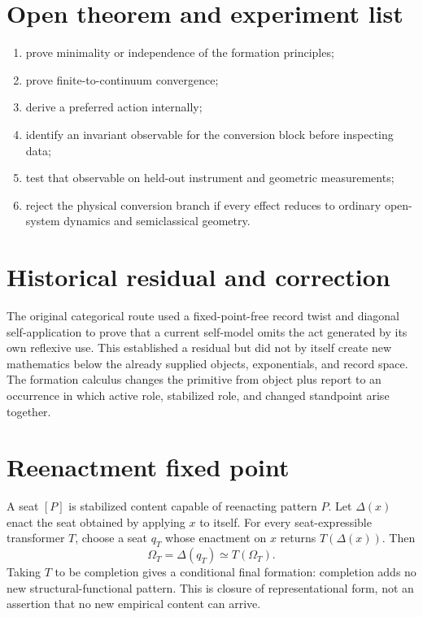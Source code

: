 \documentclass[11pt,a4paper]{article}
\begin{document}
\section{Open theorem and experiment list}
\begin{enumerate}
\item prove minimality or independence of the formation principles;
\item prove finite-to-continuum convergence;
\item derive a preferred action internally;
\item identify an invariant observable for the conversion block before inspecting data;
\item test that observable on held-out instrument and geometric measurements;
\item reject the physical conversion branch if every effect reduces to ordinary open-system dynamics and semiclassical geometry.
\end{enumerate}


\section{Historical residual and correction}
The original categorical route used a fixed-point-free record twist and diagonal self-application to prove that a current self-model omits the act generated by its own reflexive use. This established a residual but did not by itself create new mathematics below the already supplied objects, exponentials, and record space. The formation calculus changes the primitive from object plus report to an occurrence in which active role, stabilized role, and changed standpoint arise together.

\section{Reenactment fixed point}
A seat $[P]$ is stabilized content capable of reenacting pattern $P$. Let $\Delta(x)$ enact the seat obtained by applying $x$ to itself. For every seat-expressible transformer $T$, choose a seat $q_T$ whose enactment on $x$ returns $T(\Delta(x))$. Then
\begin{equation}
\Omega_T=\Delta(q_T)\simeq T(\Omega_T).
\end{equation}
Taking $T$ to be completion gives a conditional final formation: completion adds no new structural-functional pattern. This is closure of representational form, not an assertion that no new empirical content can arrive.
\end{document}
